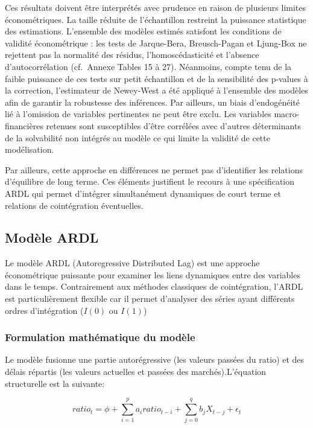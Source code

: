 \documentclass[
]{article}
\begin{document}
Ces résultats doivent être interprétés avec prudence en raison de
plusieurs limites économétriques. La taille réduite de l'échantillon
restreint la puissance statistique des estimations. L'ensemble des
modèles estimés satisfont les conditions de validité économétrique : les
tests de Jarque-Bera, Breusch-Pagan et Ljung-Box ne rejettent pas la
normalité des résidus, l'homoscédasticité et l'absence d'autocorrélation
(cf.~Annexe Tables 15 à 27). Néanmoins, compte tenu de la faible
puissance de ces tests sur petit échantillon et de la sensibilité des
p-values à la correction, l'estimateur de Newey-West a été appliqué à
l'ensemble des modèles afin de garantir la robustesse des inférences.
Par ailleurs, un biais d'endogénéité lié à l'omission de variables
pertinentes ne peut être exclu. Les variables macro-financières retenues
sont susceptibles d'être corrélées avec d'autres déterminants de la
solvabilité non intégrés au modèle ce qui limite la validité de cette
modélisation.

Par ailleurs, cette approche en différences ne permet pas d'identifier
les relations d'équilibre de long terme. Ces éléments justifient le
recours à une spécification ARDL qui permet d'intégrer simultanément
dynamiques de court terme et relations de cointégration éventuelles.

\subsection{Modèle ARDL}\label{moduxe8le-ardl}

Le modèle ARDL (Autoregressive Distributed Lag) est une approche
économétrique puissante pour examiner les liens dynamiques entre des
variables dans le temps. Contrairement aux méthodes classiques de
cointégration, l'ARDL est particulièrement flexible car il permet
d'analyser des séries ayant différents ordres d'intégration (\(I(0)\) ou
\(I(1)\))

\subsubsection{Formulation mathématique du
modèle}\label{formulation-mathuxe9matique-du-moduxe8le}

Le modèle fusionne une partie autorégressive (les valeurs passées du
ratio) et des délais répartis (les valeurs actuelles et passées des
marchés).L'équation structurelle est la suivante:

\[ratio_{t} = \phi + \sum_{i=1}^{p} a_{i} ratio_{t-i} + \sum_{j=0}^{q} b_{j} X_{t-j} + \epsilon_{t}\]
\end{document}
